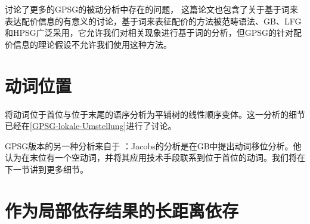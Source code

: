  \citet[--396]{Jacobson87b}讨论了更多的GPSG的被动分析中存在的问题，
这篇论文也包含了关于基于词来表达配价信息的有意义的讨论，基于词来表征配价的方法被范畴语法、GB、LFG和HPSG广泛采用，它允许我们对相关现象进行基于词的分析，但GPSG的针对配价信息的理论假设不允许我们使用这种方法。

\section{动词位置}
\label{Abschnitt-Verbstellung-GPSG}

\mbox{} \citet{Uszkoreit87a}将动词位于首位与位于末尾的语序分析为平铺树的线性顺序变体。这一分析的细节已经在\ref{GPSG-lokale-Umstellung}进行了讨论。

GPSG版本的另一种分析来自于 \citet[]{Jacobs86a}：Jacobs的分析是在GB中提出动词移位分析。他认为在末位有一个空动词，并将其应用技术手段联系到位于首位的动词。我们将在下一节讲到更多细节。

\section{作为局部依存结果的长距离依存}
\label{Abschnitt-GPSG-Fernabhaengigkeiten}\label{sec-nld-gpsg}

